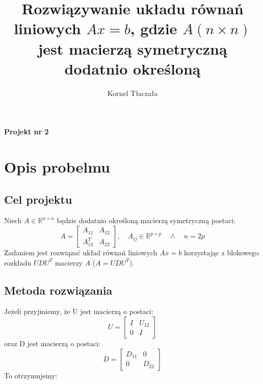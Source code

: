 \documentclass{article}
\title{Rozwiązywanie układu równań liniowych \(Ax = b\), gdzie \(A(n \times n)\) jest macierzą symetryczną dodatnio określoną}
\author{Kornel Tłaczała}
\begin{document}
\maketitle

\vspace{0.2cm}
\begin{center}
\textbf{\large Projekt nr 2} \\
\end{center}

\section{Opis probelmu}
    \subsection*{Cel projektu}
Niech \(A \in \mathbb{R}^{n \times n} \) będzie dodatnio określoną macierzą symetryczną postaci:
\[
A=\begin{bmatrix}
    A_{11} & A_{12}\\
    A_{12}^T & A_{22}
\end{bmatrix},
\quad A_{ij} \in \mathbb{R}^{p \times p} \quad \wedge \quad n=2p
\]
Zadaniem jest rozwiązać układ równań liniowych \(Ax = b\) korzystając z blokowego rozkładu \(UDU^T\) macierzy \(A\) (\(A = UDU^T\)).
    \subsection*{Metoda rozwiązania}
Jeżeli przyjmiemy, że U jest macierzą o postaci:
\[
U=\begin{bmatrix}
    I & U_{12}\\
    0 & I
\end{bmatrix}
\]
oraz D jest macierzą o postaci:
\[
D=\begin{bmatrix}
    D_{11} & 0\\
    0 & D_{22}
\end{bmatrix}
\]
To otrzymujemy:
\end{document}
